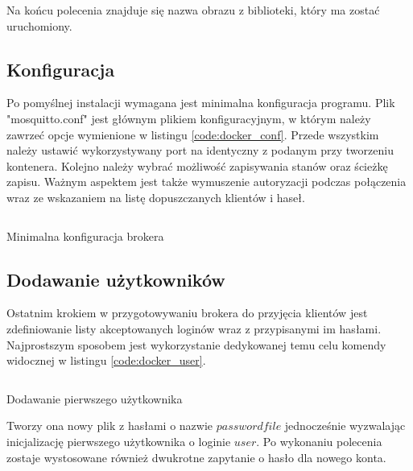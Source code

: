             Na końcu polecenia znajduje się nazwa obrazu z biblioteki, który ma zostać uruchomiony.
        
        \subsection{Konfiguracja}
            Po pomyślnej instalacji wymagana jest minimalna konfiguracja programu. Plik "mosquitto.conf" jest głównym plikiem konfiguracyjnym, w którym należy zawrzeć opcje wymienione w listingu \ref{code:docker_conf}. Przede wszystkim należy ustawić wykorzystywany port na identyczny z podanym przy tworzeniu kontenera. Kolejno należy wybrać możliwość zapisywania stanów oraz ścieżkę zapisu. Ważnym aspektem jest także wymuszenie autoryzacji podczas połączenia wraz ze wskazaniem na listę dopuszczanych klientów i haseł.
            
            \begin{kod}
                \inputminted[firstline=7, lastline=11]{sh}{mqtt/listings/docker.sh}
                \caption{Minimalna konfiguracja brokera}
                \label{code:docker_conf}
                \vspace{2em}
            \end{kod}
            
        \subsection{Dodawanie użytkowników}
            Ostatnim krokiem w przygotowywaniu brokera do przyjęcia klientów jest zdefiniowanie listy akceptowanych loginów wraz z przypisanymi im hasłami. Najprostszym sposobem jest wykorzystanie dedykowanej temu celu komendy widocznej w listingu \ref{code:docker_user}.
            
            \begin{kod}
                \inputminted[firstline=14]{sh}{mqtt/listings/docker.sh}
                \caption{Dodawanie pierwszego użytkownika}
                \label{code:docker_user}
                \vspace{2em}
            \end{kod}
            
            Tworzy ona nowy plik z hasłami o nazwie $passwordfile$ jednocześnie wyzwalając inicjalizację pierwszego użytkownika o loginie $user$. Po wykonaniu polecenia zostaje wystosowane również dwukrotne zapytanie o hasło dla nowego konta.